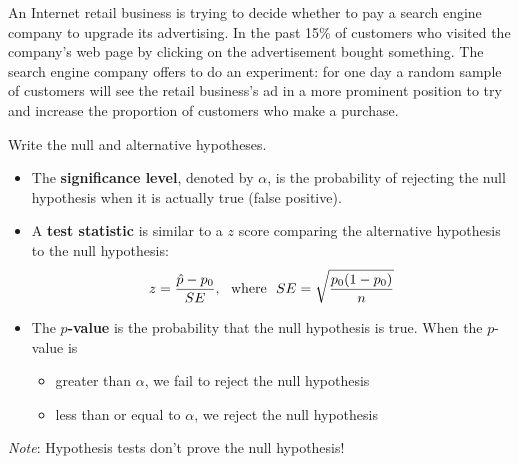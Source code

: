 \documentclass[../mathNotesPreamble]{subfiles}
\begin{document}
    \begin{ex*}
      An Internet retail business is trying to decide whether to pay a search engine company to upgrade its advertising. In the past 15\% of customers who visited the company's web page by clicking on the advertisement bought something. %
      The search engine company offers to do an experiment: for one day a random sample of customers will see the retail business's ad in a more prominent position to try and increase the proportion of customers who make a purchase.

      Write the null and alternative hypotheses.
    \end{ex*}
    \pagebreak

    \begin{defn*}
      \begin{itemize}
        \item The \textbf{significance level}, denoted by $\alpha$, is the probability of rejecting the null hypothesis when it is actually true (false positive).
        \item A \textbf{test statistic} is similar to a $z$ score comparing the alternative hypothesis to the null hypothesis:
          \[z=\frac{\hat{p}-p_0}{SE},\ \textnormal{ where }\  SE=\sqrt{\frac{p_0(1-p_0)}{n}}\]
        \item The \textbf{$p$-value} is the probability that the null hypothesis is true. When the $p$-value is
          \begin{itemize}
            \item greater than $\alpha$, we fail to reject the null hypothesis
            \item less than or equal to $\alpha$, we reject the null hypothesis
          \end{itemize}
      \end{itemize}
      \emph{Note}: Hypothesis tests don't prove the null hypothesis!
    \end{defn*}



  \pagebreak
\end{document}
